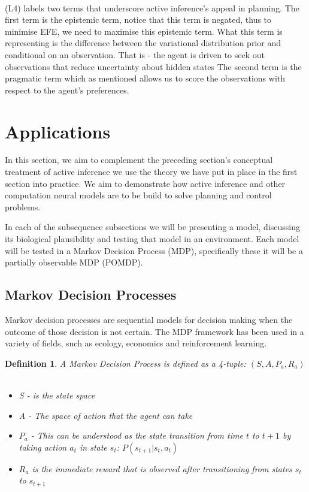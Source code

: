\documentclass{article}
\newtheorem{definition}{Definition}
\begin{document}
\

(L4) labels two terms that underscore active inference's appeal in planning. The first term is the epistemic term, notice that this term is negated, thus to minimise EFE, we need to maximise this epistemic term. What this term is representing is the difference between the variational distribution prior and conditional on an observation. That is - the agent is driven to seek out observations that reduce uncertainty about hidden states \citep{smith2022} The second term is the pragmatic term which as mentioned allows us to score the observations with respect to the agent's preferences. 

\section{Applications}


In this section, we aim to complement the preceding section's conceptual treatment of active inference we use the theory we have put in place in the first section into practice. We aim to demonstrate how active inference and other computation neural models are to be build to solve planning and control problems. 


In each of the subsequence subsections we will be presenting a model, discussing its biological plausibility and testing that model in an environment. Each model will be tested in a Markov Decision Process (MDP), specifically these it will be a partially observable MDP (POMDP). 



\subsection{Markov Decision Processes}

Markov decision processes are sequential models for decision making when the outcome of those decision is not certain. The MDP framework has been used in a variety of fields, such as ecology, economics and reinforcement learning.

\begin{definition}
	A Markov Decision Process is defined as a 4-tuple: $(S, A, P_a, R_a)$
	\
	\begin{itemize}
		\item S - is the state space
		\item A - The space of action that the agent can take
		\item $P_a$ - This can be understood as the state transition from time $t$ to $t+1$ by taking action $a_t$ in state $s_t$: $P(s_{t+1} | s_t, a_{t})$
		\item $R_a$ is the immediate reward that is observed after transitioning from states $s_t$ to $s_{t+1}$ 
	\end{itemize}
\end{definition}
\end{document}
